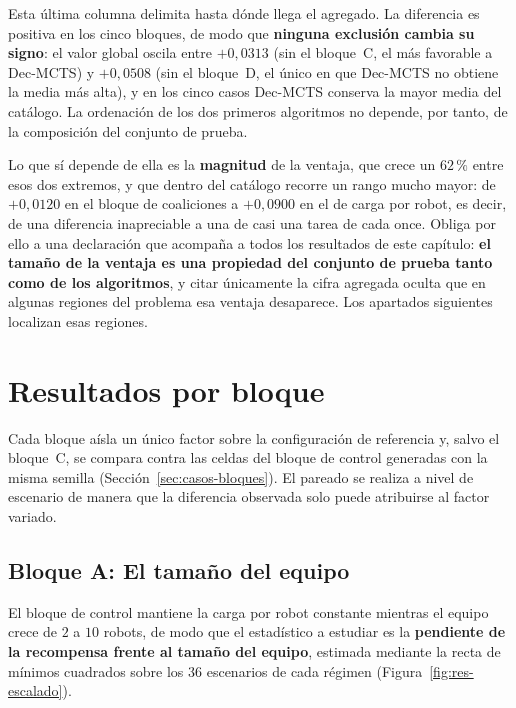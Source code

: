 Esta última columna delimita hasta dónde llega el agregado. La diferencia es positiva en los cinco bloques, de modo que \textbf{ninguna exclusión cambia su signo}: el valor global oscila entre $+0{,}0313$ (sin el bloque~C, el más favorable a Dec-MCTS) y $+0{,}0508$ (sin el bloque~D, el único en que Dec-MCTS no obtiene la media más alta), y en los cinco casos Dec-MCTS conserva la mayor media del catálogo. La ordenación de los dos primeros algoritmos no depende, por tanto, de la composición del conjunto de prueba.

Lo que sí depende de ella es la \textbf{magnitud} de la ventaja, que crece un $62\,\text{\%}$ entre esos dos extremos, y que dentro del catálogo recorre un rango mucho mayor: de $+0{,}0120$ en el bloque de coaliciones a $+0{,}0900$ en el de carga por robot, es decir, de una diferencia inapreciable a una de casi una tarea de cada once. Obliga por ello a una declaración que acompaña a todos los resultados de este capítulo: \textbf{el tamaño de la ventaja es una propiedad del conjunto de prueba tanto como de los algoritmos}, y citar únicamente la cifra agregada oculta que en algunas regiones del problema esa ventaja desaparece. Los apartados siguientes localizan esas regiones.

\section{Resultados por bloque} \label{sec:exp-bloques}

Cada bloque aísla un único factor sobre la configuración de referencia y, salvo el bloque~C, se compara contra las celdas del bloque de control generadas con la misma semilla (Sección~\ref{sec:casos-bloques}). El pareado se realiza a nivel de escenario de manera que la diferencia observada solo puede atribuirse al factor variado.

\subsection{Bloque A: El tamaño del equipo} \label{subsec:exp-bloqueA}

El bloque de control mantiene la carga por robot constante mientras el equipo crece de $2$ a $10$ robots, de modo que el estadístico a estudiar es la \textbf{pendiente de la recompensa frente al tamaño del equipo}, estimada mediante la recta de mínimos cuadrados sobre los $36$ escenarios de cada régimen (Figura~\ref{fig:res-escalado}).

